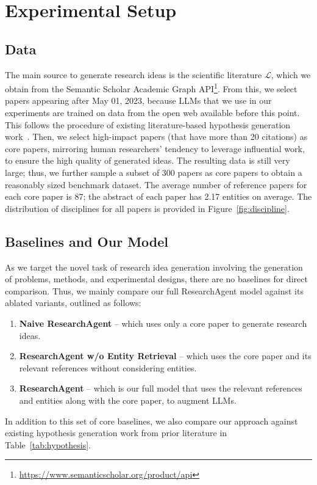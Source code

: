 \section{Experimental Setup}
\label{sec:setups}

\subsection{Data}
The main source to generate research ideas is the scientific literature $\mathcal{L}$, which we obtain from the Semantic Scholar Academic Graph API\footnote{\href{https://www.semanticscholar.org/product/api}{https://www.semanticscholar.org/product/api}}. From this, we select papers appearing after May 01, 2023, because LLMs that we use in our experiments are trained on data from the open web available before this point. This follows the procedure of existing literature-based hypothesis generation work~\cite{zeroshot/hypothesis}. Then, we select high-impact papers (that have more than 20 citations) as core papers, mirroring human researchers' tendency to leverage influential work, to ensure the high quality of generated ideas. The resulting data is still very large; thus, we further sample a subset of 300 papers as core papers to obtain a reasonably sized benchmark dataset. The average number of reference papers for each core paper is 87; the abstract of each paper has 2.17 entities on average. The distribution of disciplines for all papers is provided in Figure~\ref{fig:discipline}.

\subsection{Baselines and Our Model}
As we target the novel task of research idea generation involving the generation of problems, methods, and experimental designs, there are no baselines for direct comparison. Thus, we mainly compare our full ResearchAgent model against its ablated variants, outlined as follows:
\begin{enumerate}[itemsep=1.0mm, parsep=1pt, leftmargin=*]
    \item {\bf Naive ResearchAgent} -- which uses only a core paper to generate research ideas. 
    \item {\bf ResearchAgent w/o Entity Retrieval} -- which uses the core paper and its relevant references without considering entities.
    \item {\bf ResearchAgent} -- which is our full model that uses the relevant references and entities along with the core paper, to augment LLMs.
\end{enumerate}
In addition to this set of core baselines, we also compare our approach against existing hypothesis generation work from prior literature in Table~\ref{tab:hypothesis}.

